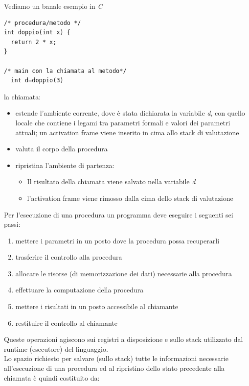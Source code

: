 \documentclass[a4paper,12pt, oneside]{book}
\begin{document}
\begin{esempio}
	Vediamo un banale esempio in \textit{C}
	\begin{verbatim}
/* procedura/metodo */
int doppio(int x) { 
  return 2 * x; 
}

/* main con la chiamata al metodo*/
  int d=doppio(3)
\end{verbatim}
	la chiamata:
	\begin{itemize}
		\item estende l'ambiente corrente, dove è stata dichiarata la variabile \textit{d}, con quello locale che contiene i legami tra parametri formali e valori dei parametri attuali; un activation frame viene inserito in cima allo stack di valutazione
		\item valuta il corpo della procedura
		\item ripristina l'ambiente di partenza:
		      \begin{itemize}
			      \item Il risultato della chiamata viene salvato nella variabile \textit{d}
			      \item l'activation frame viene rimosso dalla cima dello stack di valutazione
		      \end{itemize}
	\end{itemize}
\end{esempio}
Per l'esecuzione di una procedura un programma deve eseguire i seguenti sei passi:
\begin{enumerate}
	\item mettere i parametri in un posto dove la procedura possa recuperarli
	\item trasferire il controllo alla procedura
	\item allocare le risorse (di memorizzazione dei dati) necessarie alla procedura
	\item effettuare la computazione della procedura
	\item mettere i risultati in un posto accessibile al chiamante
	\item restituire il controllo al chiamante
\end{enumerate}
Queste operazioni agiscono sui registri a disposizione e sullo stack utilizzato dal runtime (esecutore) del linguaggio.\\
Lo spazio richiesto per salvare (sullo stack) tutte le informazioni necessarie all'esecuzione di una procedura ed al ripristino dello stato precedente alla chiamata è quindi costituito da:
\end{document}
